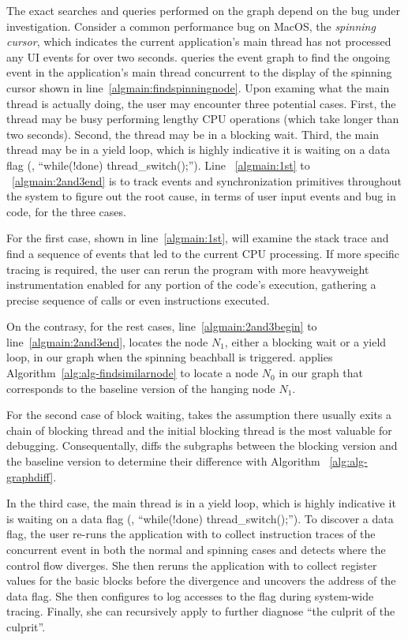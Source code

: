 The exact searches and queries performed on the graph depend on the bug under
investigation. Consider a common performance bug on MacOS, the \emph{spinning
cursor}, which indicates the current application's main thread has not processed
any UI events for over two seconds. \xxx queries the event graph to find the
ongoing event in the application's main thread concurrent to the display of
the spinning cursor shown in line~\ref{algmain:findspinningnode}. Upon examing
what the main thread is actually doing, the user may encounter three potential
cases. First, the thread may be busy performing lengthy CPU operations (which
take longer than two seconds). Second, the thread may be in a blocking wait.
Third, the main thread may be in a yield loop, which is highly indicative
it is waiting on a data flag (\eg, ``while(!done) thread\_switch();'').
Line ~\ref{algmain:1st} to ~\ref{algmain:2and3end} is to track events and
synchronization primitives throughout the system to figure out the root cause,
in terms of user input events and bug in code, for the three cases.

For the first case, shown in line~\ref{algmain:1st}, \xxx will examine
the stack trace and find a sequence of events that led to the current CPU
processing. If more specific tracing is required, the user can rerun the
program with more heavyweight instrumentation enabled for any portion of the
code's execution, gathering a precise sequence of calls or even instructions
executed.

On the contrasy, for the rest cases, line~\ref{algmain:2and3begin} to
line~\ref{algmain:2and3end}, \xxx locates the node $N_1$, either a blocking wait
or a yield loop, in our graph when the spinning beachball is triggered. \xxx
applies Algorithm~\ref{alg:alg-findsimilarnode} to locate a node $N_0$ in our
graph that corresponds to the baseline version of the hanging node $N_1$.

For the second case of block waiting, \xxx takes the assumption there usually
exits a chain of blocking thread and the initial blocking thread is the most
valuable for debugging. Consequentally, \xxx diffs the subgraphs between the
blocking version and the baseline version to determine their difference with
Algorithm ~\ref{alg:alg-graphdiff}.

In the third case, the main thread is in a yield loop, which is highly indicative it is
waiting on a data flag (\eg, ``while(!done) thread\_switch();''). To discover
a data flag, the user re-runs the application with \xxx to collect instruction
traces of the concurrent event in both the normal and spinning cases and detects
where the control flow diverges. She then reruns the application with \xxx to
collect register values for the basic blocks before the divergence and uncovers
the address of the data flag. She then configures \xxx to log accesses to the
flag during system-wide tracing. Finally, she can recursively apply \xxx to
further diagnose ``the culprit of the culprit''.

